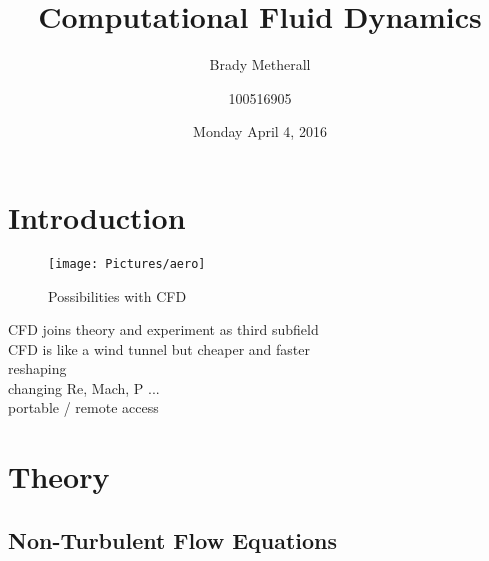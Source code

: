 \documentclass[10pt, titlepage]{article}
\title{Computational Fluid Dynamics}
\author{Brady Metherall \and 100516905}
\date{Monday April 4, 2016}
\begin{document}
\maketitle
\setlength\parindent{0pt}
\lstset{language=myMMA}

\listoffigures

\section{Introduction}

\begin{wrapfigure}{R}{0.5\textwidth}
\centering
\texttt{[image: Pictures/aero]}
\caption[Possibilities with CFD]{Possibilities with CFD \cite{aeroplane}}
\label{fig:aeroplane}
\end{wrapfigure}

CFD joins theory and experiment as third subfield \\
CFD is like a wind tunnel but cheaper and faster \\
reshaping \\
changing Re, Mach, P ... \\
portable / remote access \\

\lipsum[1-4]

\section{Theory}

\subsection{Non-Turbulent Flow Equations}
\end{document}
